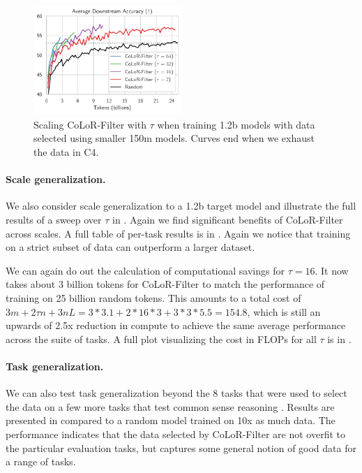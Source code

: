 \documentclass{article}
\begin{document}
\begin{figure}
    \centering
    \vspace{-0.6cm}
    \includegraphics[width=0.5\textwidth]{images/1b_all_down.pdf}
    \vspace{-0.6cm}
    \caption{Scaling CoLoR-Filter with $ \tau$ when training 1.2b models with data selected using smaller 150m models. Curves end when we exhaust the data in C4.}
    \label{fig:down_1b_tau}
\end{figure}


\paragraph{Scale generalization.} We also consider scale generalization to a 1.2b target model and illustrate the full results of a sweep over $ \tau $ in . Again we find significant benefits of CoLoR-Filter across scales. A full table of per-task results is in .  Again we notice that training on a strict subset of data can outperform a larger dataset.

We can again do out the calculation of computational savings for $ \tau = 16$. 
It now takes about 3 billion tokens for CoLoR-Filter to match the performance of training on 25 billion random tokens. This amounts to a total cost of $ 3 m + 2\tau n + 3nL = 3 * 3.1 + 2 * 16 * 3 + 3 * 3 * 5.5 = 154.8$, which is still an upwards of 2.5x reduction in compute to achieve the same average performance across the suite of tasks. A full plot visualizing the cost in FLOPs for all $ \tau$ is in .


\paragraph{Task generalization.} 
We can also test task generalization beyond the 8 tasks that were used to select the data on a few more tasks that test common sense reasoning \citep{wang2019superglue, socher-etal-2013-recursive, talmor2018commonsenseqa, sap2019socialiqa}. Results are presented in  compared to a random model trained on 10x as much data. The performance indicates that the data selected by CoLoR-Filter are not overfit to the particular evaluation tasks, but captures some general notion of good data for a range of tasks.
\end{document}
